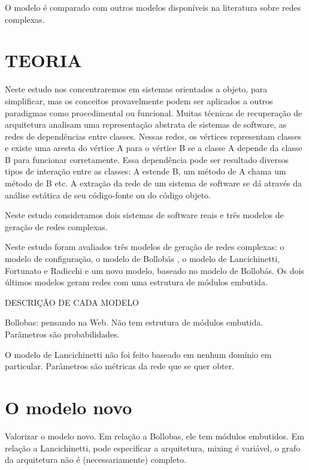 \documentclass{acm_proc_article-sp}
\begin{document}
O modelo é comparado com outros modelos disponíveis na literatura sobre redes complexas.


\section{TEORIA}

Neste estudo nos concentraremos em sistemas orientados a objeto, para simplificar, mas os conceitos provavelmente podem ser aplicados a outros paradigmas como procedimental ou funcional. 
Muitas técnicas de recuperação de arquitetura analisam uma representação abstrata de sistemas de software, as redes de dependências entre classes. Nessas redes, os vértices representam classes e existe uma aresta do vértice A para o vértice B se a classe A depende da classe B para funcionar corretamente. Essa dependência pode ser resultado diversos tipos de interação entre as classes: A estende B, um método de A chama um método de B etc.
A extração da rede de um sistema de software se dá através da análise estática de seu código-fonte ou do código objeto.

Neste estudo consideramos dois sistemas de software reais e três modelos de geração de redes complexas.

Neste estudo foram avaliados três modelos de geração de redes complexas: o modelo de configuração, o modelo de Bollobás \cite{Bollobas2003}, o modelo de Lancichinetti, Fortunato e Radicchi \cite{Lancichinetti2008} e um novo modelo, baseado no modelo de Bollobás. Os dois últimos modelos geram redes com uma estrutura de módulos embutida.

DESCRIÇÃO DE CADA MODELO

Bollobas: pensando na Web. Não tem estrutura de módulos embutida. Parâmetros são probabilidades.

O modelo de Lancichinetti não foi feito baseado em nenhum domínio em particular. Parâmetros são métricas da rede que se quer obter.

\section{O modelo novo}

Valorizar o modelo novo. Em relação a Bollobas, ele tem módulos embutidos. Em relação a Lancichinetti, pode especificar a arquitetura, mixing é variável, o grafo da arquitetura não é (necessariamente) completo.
\end{document}
